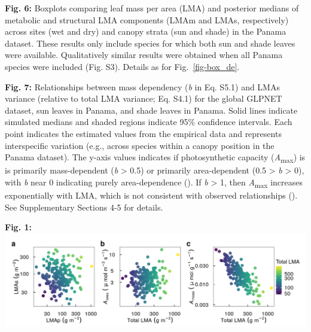 \documentclass[
  12pt,
  letterpaper,
  DIV=11,
  numbers=noendperiod]{scrartcl}
\begin{document}
\begin{figure}

\centering{

}

\caption{\label{fig-box_pa}}

\end{figure}%

\textbf{Fig. 6:} Boxplots comparing leaf mass per area (LMA) and
posterior medians of metabolic and structural LMA components (LMAm and
LMAs, respectively) across sites (wet and dry) and canopy strata (sun
and shade) in the Panama dataset. These results only include species for
which both sun and shade leaves were available. Qualitatively similar
results were obtained when all Panama species were included (Fig. S3).
Details as for Fig.~\ref{fig-box_de}.

\begin{figure}

\centering{

}

\caption{\label{fig-mass_prop}}

\end{figure}%

\textbf{Fig. 7:} Relationships between mass dependency (\emph{b} in Eq.
S5.1) and LMAs variance (relative to total LMA variance; Eq. S4.1) for
the global GLPNET dataset, sun leaves in Panama, and shade leaves in
Panama. Solid lines indicate simulated medians and shaded regions
indicate 95\% confidence intervals. Each point indicates the estimated
values from the empirical data and represents interspecific variation
(e.g., across species within a canopy position in the Panama dataset).
The y-axis values indicates if photosynthetic capacity
(\emph{A}\textsubscript{max}) is is primarily mass-dependent (\emph{b}
\textgreater{} 0.5) or primarily area-dependent (0.5 \textgreater{}
\emph{b} \textgreater{} 0), with \emph{b} near 0 indicating purely
area-dependence (). If
\emph{b} \textgreater{} 1, then \emph{A}\textsubscript{max} increases
exponentially with LMA, which is not consistent with observed
relationships (). See
Supplementary Sections 4-5 for details.

\newpage

\textbf{Fig. 1:} \includegraphics{../figs/hypo.png} \newpage
\end{document}
